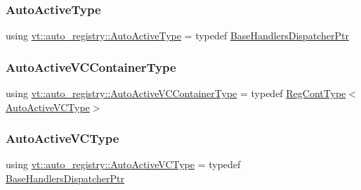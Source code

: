 \mbox{\label{namespacevt_1_1auto__registry_a2c91a60d4d3c0d80a563c3d4f54162eb}} 
\subsubsection{\texorpdfstring{Auto\+Active\+Type}{AutoActiveType}}
{\footnotesize\ttfamily using \hyperlink{namespacevt_1_1auto__registry_a2c91a60d4d3c0d80a563c3d4f54162eb}{vt\+::auto\+\_\+registry\+::\+Auto\+Active\+Type} = typedef \hyperlink{namespacevt_1_1auto__registry_a0166496b1137bbc1b20adfeb5e19cf0e}{Base\+Handlers\+Dispatcher\+Ptr}}

\mbox{\label{namespacevt_1_1auto__registry_a39e866b6d2db660ab9cd9f7cacfa5595}} 
\subsubsection{\texorpdfstring{Auto\+Active\+V\+C\+Container\+Type}{AutoActiveVCContainerType}}
{\footnotesize\ttfamily using \hyperlink{namespacevt_1_1auto__registry_a39e866b6d2db660ab9cd9f7cacfa5595}{vt\+::auto\+\_\+registry\+::\+Auto\+Active\+V\+C\+Container\+Type} = typedef \hyperlink{namespacevt_1_1auto__registry_a988a4943e4c8fe82b56f5b13bddceb2b}{Reg\+Cont\+Type}$<$\hyperlink{namespacevt_1_1auto__registry_a3e4aadbe33ef7af6d8b87f72876aee41}{Auto\+Active\+V\+C\+Type}$>$}

\mbox{\label{namespacevt_1_1auto__registry_a3e4aadbe33ef7af6d8b87f72876aee41}} 
\subsubsection{\texorpdfstring{Auto\+Active\+V\+C\+Type}{AutoActiveVCType}}
{\footnotesize\ttfamily using \hyperlink{namespacevt_1_1auto__registry_a3e4aadbe33ef7af6d8b87f72876aee41}{vt\+::auto\+\_\+registry\+::\+Auto\+Active\+V\+C\+Type} = typedef \hyperlink{namespacevt_1_1auto__registry_a0166496b1137bbc1b20adfeb5e19cf0e}{Base\+Handlers\+Dispatcher\+Ptr}}

